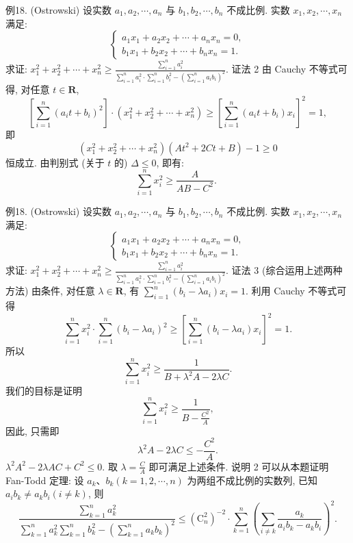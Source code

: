 例18. (Ostrowski) 设实数 $a_1, a_2, \cdots, a_n$ 与 $b_1, b_2, \cdots, b_n$ 不成比例.
实数 $x_1, x_2, \cdots, x_n$ 满足:
$$
\left\{\begin{array}{l}
a_1 x_1+a_2 x_2+\cdots+a_n x_n=0, \\
b_1 x_1+b_2 x_2+\cdots+b_n x_n=1 .
\end{array}\right.
$$
求证: $x_1^2+x_2^2+\cdots+x_n^2 \geqslant \frac{\sum_{i=1}^n a_i^2}{\sum_{i=1}^n a_i^2 \cdot \sum_{i=1}^n b_i^2-\left(\sum_{i=1}^n a_i b_i\right)^2}$.
证法 2 由 Cauchy 不等式可得, 对任意 $t \in \mathbf{R}$,
$$
\left[\sum_{i=1}^n\left(a_i t+b_i\right)^2\right] \cdot\left(x_1^2+x_2^2+\cdots+x_n^2\right) \geqslant\left[\sum_{i=1}^n\left(a_i t+b_i\right) x_i\right]^2=1,
$$
即
$$
\left(x_1^2+x_2^2+\cdots+x_n^2\right)\left(A t^2+2 C t+B\right)-1 \geqslant 0
$$
恒成立.
由判别式 (关于 $t$ 的) $\Delta \leqslant 0$, 即有:
$$
\sum_{i=1}^n x_i^2 \geqslant \frac{A}{A B-C^2} \text {. }
$$



例18. (Ostrowski) 设实数 $a_1, a_2, \cdots, a_n$ 与 $b_1, b_2, \cdots, b_n$ 不成比例.
实数 $x_1, x_2, \cdots, x_n$ 满足:
$$
\left\{\begin{array}{l}
a_1 x_1+a_2 x_2+\cdots+a_n x_n=0, \\
b_1 x_1+b_2 x_2+\cdots+b_n x_n=1 .
\end{array}\right.
$$
求证: $x_1^2+x_2^2+\cdots+x_n^2 \geqslant \frac{\sum_{i=1}^n a_i^2}{\sum_{i=1}^n a_i^2 \cdot \sum_{i=1}^n b_i^2-\left(\sum_{i=1}^n a_i b_i\right)^2}$.
证法 3 (综合运用上述两种方法)
由条件, 对任意 $\lambda \in \mathbf{R}$, 有 $\sum_{i=1}^n\left(b_i-\lambda a_i\right) x_i=1$.
利用 Cauchy 不等式可得
$$
\sum_{i=1}^n x_i^2 \cdot \sum_{i=1}^n\left(b_i-\lambda a_i\right)^2 \geqslant\left[\sum_{i=1}^n\left(b_i-\lambda a_i\right) x_i\right]^2=1 .
$$
所以
$$
\sum_{i=1}^n x_i^2 \geqslant \frac{1}{B+\lambda^2 A-2 \lambda C} .
$$
我们的目标是证明
$$
\sum_{i=1}^n x_i^2 \geqslant \frac{1}{B-\frac{C^2}{A}},
$$
因此, 只需即
$$
\lambda^2 A-2 \lambda C \leqslant-\frac{C^2}{A} .
$$
$\lambda^2 A^2-2 \lambda A C+C^2 \leqslant 0$.
取 $\lambda=\frac{C}{A}$ 即可满足上述条件.
说明 2 可以从本题证明 Fan-Todd 定理:
设 $a_k 、 b_k(k=1,2, \cdots, n)$ 为两组不成比例的实数列, 已知 $a_i b_k \neq a_k b_i(i \neq k)$, 则
$$
\frac{\sum_{k=1}^n a_k^2}{\sum_{k=1}^n a_k^2 \sum_{k=1}^n b_k^2-\left(\sum_{k=1}^n a_k b_k\right)^2} \leqslant\left(\mathrm{C}_n^2\right)^{-2} \cdot \sum_{k=1}^n\left(\sum_{i \neq k} \frac{a_k}{a_i b_k-a_k b_i}\right)^2 .
$$



